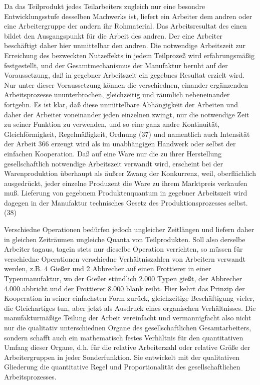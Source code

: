 {Da das Teilprodukt jedes Teilarbeiters zugleich nur eine besondre
Entwicklungsstufe desselben Machwerks ist, liefert ein Arbeiter dem
andren oder eine Arbeitergruppe der andern ihr Rohmaterial. Das
Arbeitsresultat des einen bildet den Ausgangspunkt für die Arbeit des
andren. Der eine Arbeiter beschäftigt daher hier unmittelbar den andren.
Die notwendige Arbeitszeit zur Erreichung des bezweckten Nutzeffekts in
jedem Teilprozeß wird erfahrungsmäßig festgestellt, und der
Gesamtmechanismus der Manufaktur beruht auf der Voraussetzung, daß in
gegebner Arbeitszeit ein gegebnes Resultat erzielt wird. Nur unter
dieser Voraussetzung können die verschiednen, einander ergänzenden
Arbeitsprozesse ununterbrochen, gleichzeitig und räumlich nebeneinander
fortgehn. Es ist klar, daß diese unmittelbare Abhängigkeit der Arbeiten
und daher der Arbeiter voneinander jeden einzelnen zwingt, nur die
notwendige Zeit zu seiner Funktion zu verwenden, und so eine ganz andre
Kontinuität, Gleichförmigkeit, Regelmäßigkeit, Ordnung (37) und
namentlich auch Intensität der Arbeit \num{366}
erzeugt wird als im unabhängigen Handwerk oder selbst der einfachen
Kooperation. Daß auf eine Ware nur die zu ihrer Herstellung
gesellschaftlich notwendige Arbeitszeit verwandt wird, erscheint bei der
Warenproduktion überhaupt als äußrer Zwang der Konkurrenz, weil,
oberflächlich ausgedrückt, jeder einzelne Produzent die Ware zu ihrem
Marktpreis verkaufen muß. Lieferung von gegebnem Produktenquantum in
gegebner Arbeitszeit wird dagegen in der Manufaktur technisches Gesetz
des Produktionsprozesses selbst.(38)

Verschiedne Operationen bedürfen jedoch ungleicher Zeitlängen und
liefern daher in gleichen Zeiträumen ungleiche Quanta von Teilprodukten.
Soll also derselbe Arbeiter tagaus, tagein stets nur dieselbe Operation
verrichten, so müssen für verschiedne Operationen verschiedne
Verhältniszahlen von Arbeitern verwandt werden, z.B. 4 Gießer und 2
Abbrecher auf einen Frottierer in einer Typenmanufaktur, wo der Gießer
stündlich 2.000 Typen gießt, der Abbrecher 4.000 abbricht und der
Frottierer 8.000 blank reibt. Hier kehrt das Prinzip der Kooperation in
seiner einfachsten Form zurück, gleichzeitige Beschäftigung vieler, die
Gleichartiges tun, aber jetzt als Ausdruck eines organischen
Verhältnisses. Die manufakturmäßige Teilung der Arbeit vereinfacht und
vermannigfacht also nicht nur die qualitativ unterschiednen Organe des
gesellschaftlichen Gesamtarbeiters, sondern schafft auch ein
mathematisch festes Verhältnis für den quantitativen Umfang dieser
Organe, d.h. für die relative Arbeiterzahl oder relative Größe der
Arbeitergruppen in jeder Sonderfunktion. Sie entwickelt mit der
qualitativen Gliederung die quantitative Regel und Proportionalität des
gesellschaftlichen Arbeitsprozesses.

}
